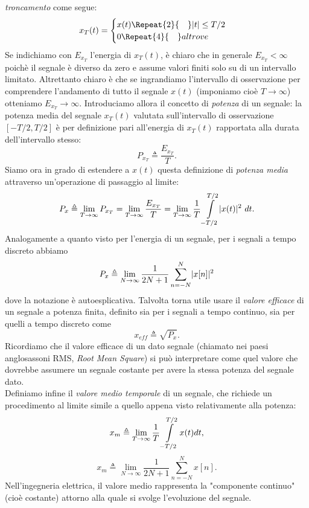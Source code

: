 \documentclass[12pt,oneside,openany]{memoir}
\numberwithin{equation}{subsection}
\DeclarePairedDelimiter{\abs}{\lvert}{\rvert}
\newcommand{\quads}[1]{\Repeat{#1}{\quad}}
\newcommand{\dt}{\ dt}
\begin{document}
\textit{troncamento} come segue:
\begin{equation}
	x_T(t) = \begin{cases}
			x(t) \quads{2} \abs{t} \leq T/2\\
			0 \quads{4} altrove
		 \end{cases}
\end{equation}
Se indichiamo con $E_{x_T}$ l'energia di $x_T(t)$, \`e chiaro che in generale
$E_{x_T} < \infty$ poich\`e il segnale \`e diverso da zero e assume valori
finiti solo su di un intervallo limitato. Altrettanto chiaro \`e che se
ingrandiamo l'intervallo di osservazione per comprendere l'andamento di tutto il
segnale $x(t)$ (imponiamo cio\`e $T \rightarrow \infty$) otteniamo
$E_{x_T} \rightarrow \infty$. Introduciamo allora il concetto di
\textit{potenza} di un segnale: la potenza media del segnale $x_T(t)$ valutata
sull'intervallo di osservazione $\left[-T/2, T/2\right]$ \`e per definizione
pari all'energia di $x_T(t)$ rapportata alla durata dell'intervallo stesso:
\begin{equation}
	P_{x_T} \triangleq \frac{E_{x_T}}{T}.
\end{equation}
Siamo ora in grado di estendere a $x(t)$ questa definizione di \textit{potenza
media} attraverso un'operazione di passaggio al limite:
\begin{equation}\label{eq:signal_power}
	P_x \triangleq \lim_{T \rightarrow \infty} P_{x_T} =
	\lim_{T \rightarrow \infty} \frac{E_{x_T}}{T} =
	\lim_{T \rightarrow \infty} \frac{1}{T} \int\displaylimits_{-T/2}^{T/2}
	\abs{x(t)}^2 \dt.
\end{equation}
Analogamente a quanto visto per l'energia di un segnale, per i segnali a tempo
discreto abbiamo
\begin{equation}
	P_x \triangleq \lim_{N \rightarrow \infty} \frac{1}{2N + 1}
	\sum_{n = -N}^{N} \abs{x[n]}^2
\end{equation}
dove la notazione \`e autoesplicativa.
Talvolta torna utile usare il \textit{valore efficace} di un segnale a potenza
finita, definito sia per i segnali a tempo continuo, sia per quelli a tempo
discreto come
\begin{equation}
	x_{eff} \triangleq \sqrt{P_x}.
\end{equation}
Ricordiamo che il valore efficace di un dato segnale (chiamato nei paesi
anglosassoni RMS, \textit{Root Mean Square}) si pu\`o interpretare come quel
valore che dovrebbe assumere un segnale costante per avere la stessa potenza del
segnale dato.\\
Definiamo infine il \textit{valore medio temporale} di un segnale, che richiede
un procedimento al limite simile a quello appena visto relativamente alla
potenza:
\begin{equation}
	x_m \triangleq \lim_{T \rightarrow \infty} \frac{1}{T}
	\int\displaylimits_{-T/2}^{T/2} x(t) dt,
\end{equation}
\begin{equation}
	x_m \triangleq \lim_{N \rightarrow \infty} \frac{1}{2N + 1}
	\sum_{n = -N}^{N} x[n].
\end{equation}
Nell'ingegneria elettrica, il valore medio rappresenta la "componente continuo"
(cio\`e costante) attorno alla quale si svolge l'evoluzione del segnale.
\end{document}
